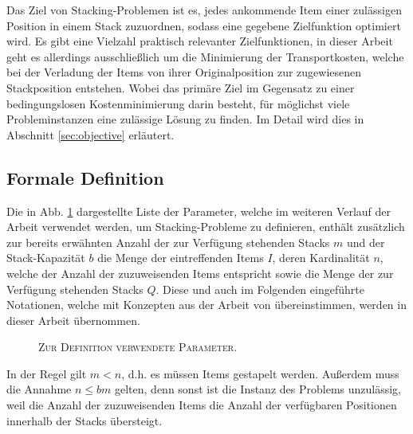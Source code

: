 Das Ziel von Stacking-Problemen ist es, jedes ankommende Item einer zulässigen Position in einem
Stack zuzuordnen, sodass eine gegebene Zielfunktion optimiert wird. Es gibt eine Vielzahl praktisch relevanter Zielfunktionen,
in dieser Arbeit geht es allerdings ausschließlich um die Minimierung der Transportkosten, welche bei der Verladung der Items von ihrer Originalposition zur zugewiesenen Stackposition entstehen. Wobei das primäre Ziel im Gegensatz zu einer bedingungslosen Kostenminimierung darin besteht, für möglichst viele Probleminstanzen eine zulässige Lösung zu finden. Im Detail wird dies in
Abschnitt \ref{sec:objective} erläutert.

\subsection{Formale Definition}
\label{sec:formal_definition}

Die in Abb. \ref{fig:parameters} dargestellte Liste der Parameter, welche im weiteren Verlauf der Arbeit verwendet
werden, um Stacking-Probleme zu definieren, enthält zusätzlich zur bereits erwähnten Anzahl der zur Verfügung stehenden
Stacks $m$ und der Stack-Kapazität $b$ die Menge der eintreffenden Items $I$, deren Kardinalität $n$, welche der Anzahl
der zuzuweisenden Items entspricht sowie die Menge der zur Verfügung stehenden Stacks $Q$. Diese und auch im Folgenden
eingeführte Notationen, welche mit Konzepten aus der Arbeit von \citet{Bruns2015} übereinstimmen,
werden in dieser Arbeit übernommen.

\begin{figure}[H]
\centering
{}
\caption{\textsc{Zur Definition verwendete Parameter}.}
\label{fig:parameters}
\end{figure}
In der Regel gilt $m < n$, d.h. es müssen Items gestapelt werden.
Außerdem muss die Annahme $n \leq bm$ gelten, denn sonst ist die Instanz des Problems unzulässig,
weil die Anzahl der zuzuweisenden Items die Anzahl der verfügbaren Positionen innerhalb der Stacks übersteigt.


